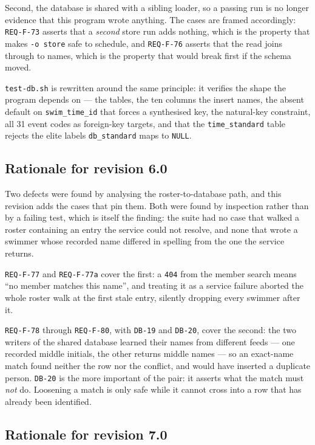 \documentclass[12pt]{article}
\newcommand{\code}[1]{\texttt{#1}}
\newcommand{\req}[1]{\texttt{#1}}
\begin{document}
Second, the database is shared with a sibling loader, so a passing run
is no longer evidence that this program wrote anything.  The cases are
framed accordingly: \req{REQ-F-73} asserts that a \emph{second} store
run adds nothing, which is the property that makes \code{-o store} safe
to schedule, and \req{REQ-F-76} asserts that the read joins through to
names, which is the property that would break first if the schema
moved.

\code{test-db.sh} is rewritten around the same principle: it verifies
the shape the program depends on --- the tables, the ten columns the
insert names, the absent default on \code{swim\_time\_id} that forces a
synthesised key, the natural-key constraint, all 31 event codes as
foreign-key targets, and that the \code{time\_standard} table rejects
the elite labels \code{db\_standard} maps to \code{NULL}.

\subsection{Rationale for revision 6.0}

Two defects were found by analysing the roster-to-database path, and
this revision adds the cases that pin them.  Both were found by
inspection rather than by a failing test, which is itself the finding:
the suite had no case that walked a roster containing an entry the
service could not resolve, and none that wrote a swimmer whose recorded
name differed in spelling from the one the service returns.

\req{REQ-F-77} and \req{REQ-F-77a} cover the first: a \code{404} from
the member search means ``no member matches this name'', and treating
it as a service failure aborted the whole roster walk at the first
stale entry, silently dropping every swimmer after it.

\req{REQ-F-78} through \req{REQ-F-80}, with \req{DB-19} and
\req{DB-20}, cover the second: the two writers of the shared database
learned their names from different feeds --- one recorded middle
initials, the other returns middle names --- so an exact-name match
found neither the row nor the conflict, and would have inserted a
duplicate person.  \req{DB-20} is the more important of the pair: it
asserts what the match must \emph{not} do.  Loosening a match is only
safe while it cannot cross into a row that has already been identified.

\subsection{Rationale for revision 7.0}
\end{document}
